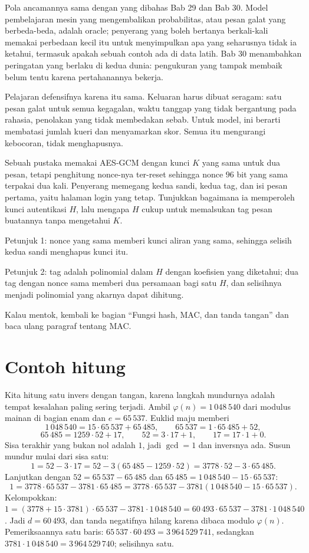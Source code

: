 Pola ancamannya sama dengan yang dibahas Bab 29 dan Bab 30. Model pembelajaran mesin yang
mengembalikan probabilitas, atau pesan galat yang berbeda-beda, adalah oracle; penyerang yang
boleh bertanya berkali-kali memakai perbedaan kecil itu untuk menyimpulkan apa yang seharusnya
tidak ia ketahui, termasuk apakah sebuah contoh ada di data latih. Bab 30 menambahkan
peringatan yang berlaku di kedua dunia: pengukuran yang tampak membaik belum tentu karena
pertahanannya bekerja.

Pelajaran defensifnya karena itu sama. Keluaran harus dibuat seragam: satu pesan galat untuk
semua kegagalan, waktu tanggap yang tidak bergantung pada rahasia, penolakan yang tidak
membedakan sebab. Untuk model, ini berarti membatasi jumlah kueri dan menyamarkan skor. Semua
itu mengurangi kebocoran, tidak menghapusnya.

\begin{tantangan}
Sebuah pustaka memakai AES-GCM dengan kunci $K$ yang sama untuk dua pesan, tetapi penghitung
nonce-nya ter-reset sehingga nonce $96$ bit yang sama terpakai dua kali. Penyerang memegang
kedua sandi, kedua tag, dan isi pesan pertama, yaitu halaman login yang tetap. Tunjukkan
bagaimana ia memperoleh kunci autentikasi $H$, lalu mengapa $H$ cukup untuk memalsukan tag pesan
buatannya tanpa mengetahui $K$.

Petunjuk 1: nonce yang sama memberi kunci aliran yang sama, sehingga selisih kedua sandi
menghapus kunci itu.

Petunjuk 2: tag adalah polinomial dalam $H$ dengan koefisien yang diketahui; dua tag dengan
nonce sama memberi dua persamaan bagi satu $H$, dan selisihnya menjadi polinomial yang akarnya
dapat dihitung.

Kalau mentok, kembali ke bagian ``Fungsi hash, MAC, dan tanda tangan'' dan baca ulang paragraf
tentang MAC.
\end{tantangan}

\section{Contoh hitung}

Kita hitung satu invers dengan tangan, karena langkah mundurnya adalah tempat kesalahan paling
sering terjadi. Ambil $\varphi(n)=1\,048\,540$ dari modulus mainan di bagian enam dan
$e=65\,537$. Euklid maju memberi
\[
1\,048\,540=15\cdot65\,537+65\,485,\qquad 65\,537=1\cdot65\,485+52,
\]
\[
65\,485=1259\cdot52+17,\qquad 52=3\cdot17+1,\qquad 17=17\cdot1+0 .
\]
Sisa terakhir yang bukan nol adalah $1$, jadi $\gcd=1$ dan inversnya ada. Susun mundur mulai
dari sisa satu:
\[
1=52-3\cdot17=52-3(65\,485-1259\cdot52)=3778\cdot52-3\cdot65\,485 .
\]
Lanjutkan dengan $52=65\,537-65\,485$ dan $65\,485=1\,048\,540-15\cdot65\,537$:
\[
1=3778\cdot65\,537-3781\cdot65\,485
=3778\cdot65\,537-3781(1\,048\,540-15\cdot65\,537).
\]
Kelompokkan: $1=(3778+15\cdot3781)\cdot65\,537-3781\cdot1\,048\,540
=60\,493\cdot65\,537-3781\cdot1\,048\,540$. Jadi $d=60\,493$, dan tanda negatifnya hilang
karena dibaca modulo $\varphi(n)$. Pemeriksaannya satu baris: $65\,537\cdot60\,493
=3\,964\,529\,741$, sedangkan $3781\cdot1\,048\,540=3\,964\,529\,740$; selisihnya satu.

